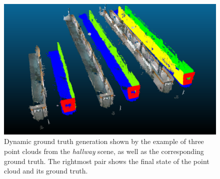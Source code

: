 \documentclass[main.tex]{subfiles}
\begin{document}
\begin{figure}[H]
    \centering
    \includegraphics[width=15 cm]{images/dynamic_eval.png}
    \caption[Dynamic Ground Truth Generation]{Dynamic ground truth generation shown by the example of three point clouds from the
    \textit{hallway} scene, as well as the corresponding ground truth. The rightmost pair shows the 
    final state of the point cloud and its ground truth.}

    \label{fig:dynGT}
\end{figure}
\end{document}
